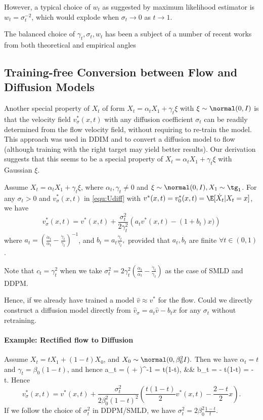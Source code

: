 However, a typical choice of $w_t$ as suggested by maximum likelihood estimator is $w_t = \sigma_t^{-2}$, which would explode when $\sigma_t \to 0$ as $t\to 1$. 

The balanced choice of $\gamma_t, \sigma_t, w_t$ has been a subject of a number of recent works from both theoretical and empirical angles 


\subsection{Training-free Conversion between Flow and Diffusion Models} 

Another special property of $X_t$ of form $X_t = \alpha_t X_1 + \gamma_t \xi$ with $\xi \sim \normal(0,I)$ is that the velocity field $v_\sigma^*(x,t)$ 
with any diffusion coefficient $\sigma_t$ can be readily determined from the flow velocity field, without requiring to re-train the model. 
This approach was used in DDIM \red{[]} and   to convert a diffusion model to flow (although training with the right target may yield better results). Our derivation suggests that this seems to be a special property of  $X_t = \alpha_t X_1 + \gamma_t \xi$ with Gaussian $\xi$. 


\begin{pro}
Assume $X_t = \alpha_t X_1 + \gamma_t \xi$, where $\alpha_t, \gamma_t \neq 0$ and $\xi \sim \normal(0, I), X_1 \sim \tg_1$. 
For any $\sigma_t >0$ and $v_\sigma^*(x,t)$ in \eqref{equ:Udiff} with $v^*(x,t) = v_0^*(x,t) =  \E[\dot X_t |X_t= x]$,  we have 
$$
v_{\sigma}^*(x,t) = v^*(x,t) + 
\frac{\sigma_t^2}{2\gamma_t^2} \left ( 
a_t v^*(x,t)  - (1+ b_t) x)
\right )
$$
where 
$a_t = \left(\frac{\dot \alpha_t}{\alpha_t} -  \frac{\dot \gamma_t}{\gamma_t} \right )^{-1}$, and 
$b_t =   a_t \frac{\dot \gamma_t}{\gamma_t},$ provided that $a_t, b_t$ are finite $\forall t\in (0,1)$.   
\end{pro}
Note that $c_t = \gamma_t^2$ when we take $\sigma_t^2 = 2 \gamma_t^2 \left(\frac{\dot \alpha_t}{\alpha_t} -  \frac{\dot \gamma_t}{\gamma_t} \right )$ as the case of SMLD and DDPM. 

Hence, if we already have trained a model $\hat v \approx v^*$ for the flow. 
Could we directly  construct a diffusion model directly from $\hat v_\sigma = a_t \hat v - b_tx$ for any $\sigma_t$ without retraining. 

\paragraph{Example: Rectified flow to Diffusion} 
Assume $X_t = t X_1 + (1-t)X_0$, and $X_0 \sim \normal(0,  \beta_0^2I).$   Then we have $\alpha_t = t$ and $\gamma_t = \beta_0 (1-t)$, and hence 
\bb  
a_t = \left (  + 
\right )^{-1} =  {t(1-t)}, &&
b_t =  - {t(1-t)}  = 
- t. 
\ee 
Hence 
$$
v_\sigma^*(x,t) =
v^*(x,t) + 
\frac{\sigma_t^2}{2 \beta_0^2(1-t)^2}  
\left ( \frac{t(1-t)}{2} v^*(x,t) - \frac{2-t}{2} x \right ).
$$
If we follow the choice of $\sigma_t^2$ in DDPM/SMLD, 
we have $\sigma_t^2 = 2\beta_0^2\frac{1-t}{t}$. 

